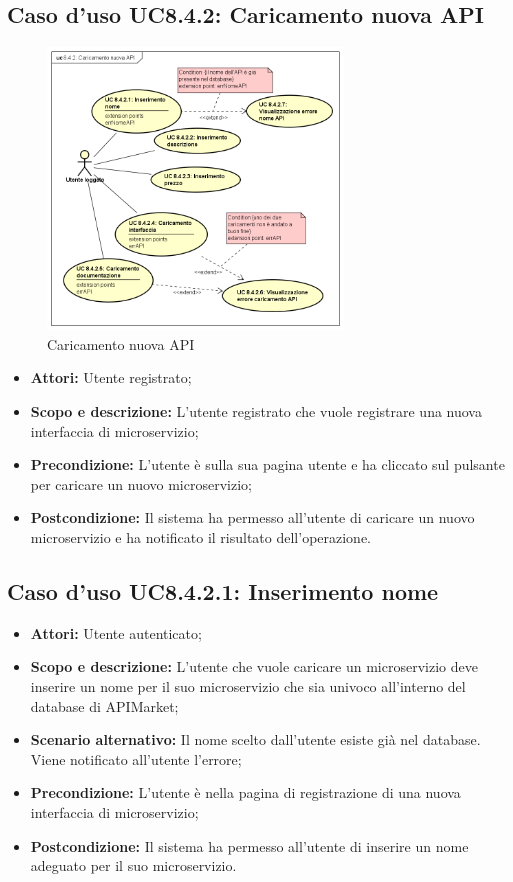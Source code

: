 \documentclass[12pt,a4paper,titlepage]{article}
\begin{document}
	\subsection{Caso d'uso UC8.4.2: Caricamento nuova API}
	\label{UC8.4.2}
	\begin{figure}[H]
		\centering
		\includegraphics[width=0.7\textwidth]{UseCase/CaricamentoNuovaAPI}
		\caption{Caricamento nuova API}
	\end{figure}
	\begin{itemize}
		\item \textbf{Attori: }Utente registrato;
		\item \textbf{Scopo e descrizione: }L'utente registrato che vuole registrare una nuova interfaccia di microservizio;
		\item \textbf{Precondizione: }L'utente è sulla sua pagina utente e ha cliccato sul pulsante per caricare un nuovo microservizio;
		\item \textbf{Postcondizione: }Il sistema ha permesso all'utente di caricare un nuovo microservizio e ha notificato il risultato dell'operazione.
	\end{itemize}
	\subsection{Caso d'uso UC8.4.2.1: Inserimento nome}
	\label{UC8.4.2.1}
	\begin{itemize}
		\item \textbf{Attori: }Utente autenticato;
		\item \textbf{Scopo e descrizione: }L'utente che vuole caricare un microservizio deve inserire un nome per il suo microservizio che sia univoco all'interno del database di APIMarket;
		\item \textbf{Scenario alternativo: }Il nome scelto dall'utente esiste già nel database. Viene notificato all'utente l'errore;
		\item \textbf{Precondizione: }L'utente è nella pagina di registrazione di una nuova interfaccia di microservizio;
		\item \textbf{Postcondizione: }Il sistema ha permesso all'utente di inserire un nome adeguato per il suo microservizio.
	\end{itemize}
\end{document}
